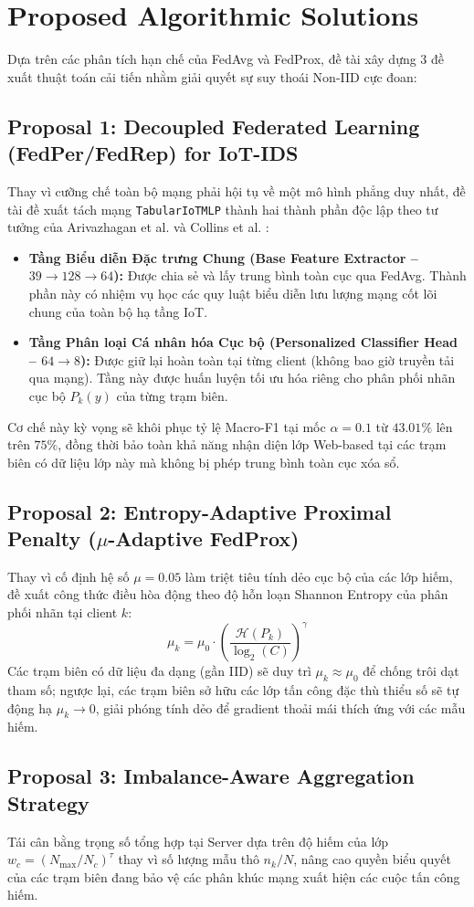 \section{Proposed Algorithmic Solutions}
\label{sec:proposals}
Dựa trên các phân tích hạn chế của FedAvg và FedProx, đề tài xây dựng 3 đề xuất thuật toán cải tiến nhằm giải quyết sự suy thoái Non-IID cực đoan:

\subsection{Proposal 1: Decoupled Federated Learning (FedPer/FedRep) for IoT-IDS}
Thay vì cưỡng chế toàn bộ mạng phải hội tụ về một mô hình phẳng duy nhất, đề tài đề xuất tách mạng \texttt{TabularIoTMLP} thành hai thành phần độc lập theo tư tưởng của Arivazhagan et al. \cite{arivazhagan2019federated} và Collins et al. \cite{collins2021exploiting}:
\begin{itemize}
    \item \textbf{Tầng Biểu diễn Đặc trưng Chung (Base Feature Extractor -- $39 \to 128 \to 64$):} Được chia sẻ và lấy trung bình toàn cục qua FedAvg. Thành phần này có nhiệm vụ học các quy luật biểu diễn lưu lượng mạng cốt lõi chung của toàn bộ hạ tầng IoT.
    \item \textbf{Tầng Phân loại Cá nhân hóa Cục bộ (Personalized Classifier Head -- $64 \to 8$):} Được giữ lại hoàn toàn tại từng client (không bao giờ truyền tải qua mạng). Tầng này được huấn luyện tối ưu hóa riêng cho phân phối nhãn cục bộ $P_k(y)$ của từng trạm biên.
\end{itemize}
Cơ chế này kỳ vọng sẽ khôi phục tỷ lệ Macro-F1 tại mốc $\alpha=0.1$ từ $43.01\%$ lên trên $75\%$, đồng thời bảo toàn khả năng nhận diện lớp Web-based tại các trạm biên có dữ liệu lớp này mà không bị phép trung bình toàn cục xóa sổ.

\subsection{Proposal 2: Entropy-Adaptive Proximal Penalty (\texorpdfstring{$\mu$}{mu}-Adaptive FedProx)}
Thay vì cố định hệ số $\mu = 0.05$ làm triệt tiêu tính dẻo cục bộ của các lớp hiếm, đề xuất công thức điều hòa động theo độ hỗn loạn Shannon Entropy của phân phối nhãn tại client $k$:
\begin{equation}
    \mu_k = \mu_0 \cdot \left( \frac{\mathcal{H}(P_k)}{\log_2(C)} \right)^\gamma
    \label{eq:adaptive_mu}
\end{equation}
Các trạm biên có dữ liệu đa dạng (gần IID) sẽ duy trì $\mu_k \approx \mu_0$ để chống trôi dạt tham số; ngược lại, các trạm biên sở hữu các lớp tấn công đặc thù thiểu số sẽ tự động hạ $\mu_k \to 0$, giải phóng tính dẻo để gradient thoải mái thích ứng với các mẫu hiếm.

\subsection{Proposal 3: Imbalance-Aware Aggregation Strategy}
Tái cân bằng trọng số tổng hợp tại Server dựa trên độ hiếm của lớp $w_c = (N_{\max}/N_c)^\tau$ thay vì số lượng mẫu thô $n_k/N$, nâng cao quyền biểu quyết của các trạm biên đang bảo vệ các phân khúc mạng xuất hiện các cuộc tấn công hiếm.
